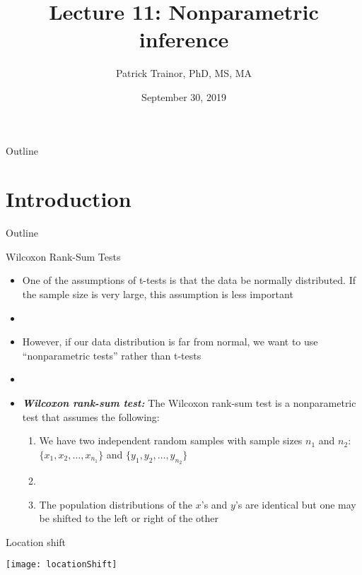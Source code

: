 \documentclass[xcolor=dvipsnames]{beamer}
\title[Lecture 11]{Lecture 11: Nonparametric inference}
\author[Patrick Trainor]{Patrick Trainor, PhD, MS, MA}
\institute[NMSU]{New Mexico State University}
\date{September 30, 2019}
\begin{document}
\begin{frame}
\maketitle
\end{frame}

\begin{frame}{Outline}
\tableofcontents[hideallsubsections]
\end{frame}

\section{Introduction}
\begin{frame}{Outline}
\tableofcontents[currentsection,subsectionstyle=show/shaded/hide]
\end{frame}

\begin{frame}{Wilcoxon Rank-Sum Tests}
	\begin{itemize}
		\item One of the assumptions of t-tests is that the data be normally distributed. If the sample size is very large, this assumption is less important
		\item[]
		\item However, if our data distribution is far from normal, we want to use ``nonparametric tests'' rather than t-tests
		\item[]
		\item \textbf{\emph{Wilcoxon rank-sum test:}} The Wilcoxon rank-sum test is a nonparametric test that assumes the following:
		
		\begin{enumerate}
			\item We have two independent random samples with sample sizes $n_1$ and $n_2$: $\{x_1, x_2, \hdots, x_{n_1}\}$ and $\{y_1, y_2, \hdots, y_{n_2}\}$
			\item[]
			\item The population distributions of the $x$'s and $y$'s are identical but one may be shifted to the left or right of the other
		\end{enumerate}
	\end{itemize}
\end{frame}

\begin{frame}{Location shift}
	\begin{center}
		\texttt{[image: locationShift]}
	\end{center}
\end{frame}
\end{document}

